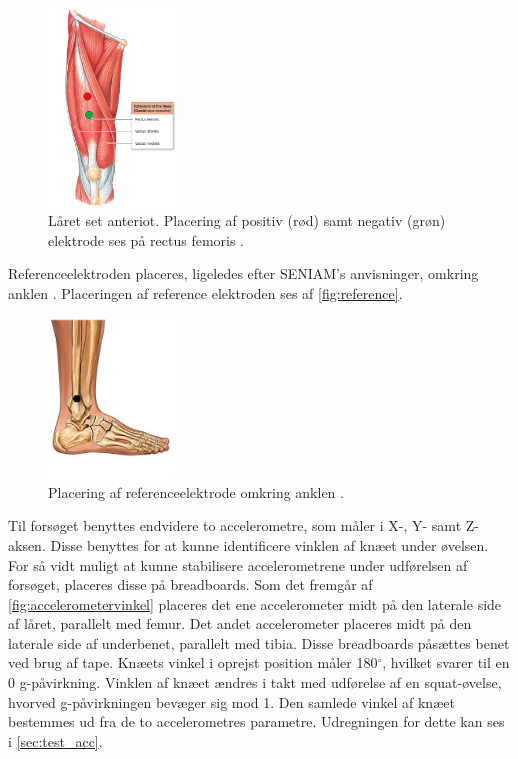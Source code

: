 \begin{figure}[H]
\centering
\includegraphics[width=0.3\textwidth]{figures/laarmuskel.png}
\caption{Låret set anteriot. Placering af positiv (rød) samt negativ (grøn) elektrode ses på rectus femoris \citep{martini2012}.}
\label{fig:laarmuskler}
\end{figure}

Referenceelektroden placeres, ligeledes efter SENIAM's anvisninger, omkring anklen \citep{seniam2016}. Placeringen af reference elektroden ses af \autoref{fig:reference}.

\begin{figure}[H]
\centering
\includegraphics[width=0.3\textwidth]{figures/reference}
\caption{Placering af referenceelektrode omkring anklen \citep{ankle2016}.}
\label{fig:reference}
\end{figure}

Til forsøget benyttes endvidere to accelerometre, som måler i X-, Y- samt Z-aksen. Disse benyttes for at kunne identificere vinklen af knæet under øvelsen. For så vidt muligt at kunne stabilisere accelerometrene under udførelsen af forsøget, placeres disse på breadboards. 
Som det fremgår af \autoref{fig:accelerometervinkel} placeres det ene accelerometer midt på den laterale side af låret, parallelt med femur. Det andet accelerometer placeres midt på den laterale side af underbenet, parallelt med tibia. Disse breadboards påsættes benet ved brug af tape. Knæets vinkel i oprejst position måler 180$^{\circ}$, hvilket svarer til en 0 g-påvirkning. Vinklen af knæet ændres i takt med udførelse af en squat-øvelse, hvorved g-påvirkningen bevæger sig mod 1. Den samlede vinkel af knæet bestemmes ud fra de to accelerometres parametre. Udregningen for dette kan ses i \autoref{sec:test_acc}.

